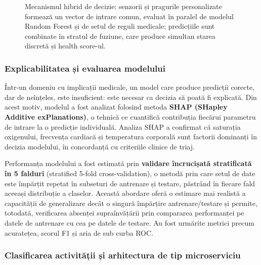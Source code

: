\documentclass[12pt,a4paper]{article}
\begin{document}
\begin{figure}[H]
{}
\caption{Mecanismul hibrid de decizie: senzorii și pragurile personalizate formează un vector de intrare comun, evaluat în paralel de modelul Random Forest și de setul de reguli medicale; predicțiile sunt combinate în stratul de fuziune, care produce simultan starea discretă și health score-ul.}
\label{fig:hibrid-ai}
\end{figure}

\subsubsection{Explicabilitatea și evaluarea modelului}

Într-un domeniu cu implicații medicale, un model care produce predicții corecte, dar de neînțeles, este insuficient: este necesar ca decizia să poată fi explicată. Din acest motiv, modelul a fost analizat folosind metoda \textbf{SHAP (SHapley Additive exPlanations)}, o tehnică ce cuantifică contribuția fiecărui parametru de intrare la o predicție individuală. Analiza SHAP a confirmat că saturația oxigenului, frecvența cardiacă și temperatura corporală sunt factorii dominanți în decizia modelului, în concordanță cu criteriile clinice de triaj.

Performanța modelului a fost estimată prin \textbf{validare încrucișată stratificată în 5 falduri} (stratified 5-fold cross-validation), o metodă prin care setul de date este împărțit repetat în subseturi de antrenare și testare, păstrând în fiecare fald aceeași distribuție a claselor. Această abordare oferă o estimare mai realistă a capacității de generalizare decât o singură împărțire antrenare/testare și permite, totodată, verificarea absenței supraînvățării prin compararea performanței pe datele de antrenare cu cea pe datele de testare. Au fost urmărite metrici precum acuratețea, scorul F1 și aria de sub curba ROC.

\subsubsection{Clasificarea activității și arhitectura de tip microserviciu}
\end{document}
